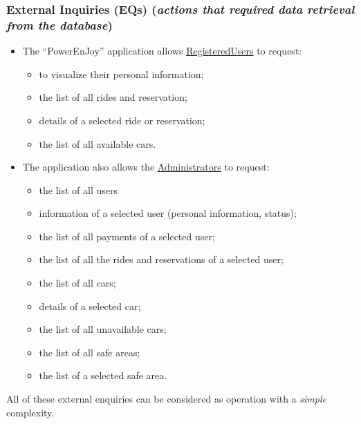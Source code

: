 \subsubsection{External Inquiries (EQs) (\textit{actions that required data retrieval from the database})}
\begin{itemize}
	\item The ``PowerEnJoy'' application allows \underline{RegisteredUsers} to request:
		\begin{itemize}
			\item to visualize their personal information;
			\item the list of all rides and reservation; 
			\item details of a selected ride or reservation;
			\item the list of all available cars.
		\end{itemize}
	\item The application also allows the \underline{Administrators} to request:
		\begin{itemize}
			\item the list of all users
			\item information of a selected user (personal information, status);
			\item the list of all payments of a selected user;
			\item the list of all the rides and reservations of a selected user;
			\item the list of all cars;
			\item details of a selected car;
			\item the list of all unavailable cars;
			\item the list of all safe areas;
			\item the list of a selected safe area.
		\end{itemize}
\end{itemize}

All of these external enquiries can be considered as operation with a \textit{simple} complexity. 

